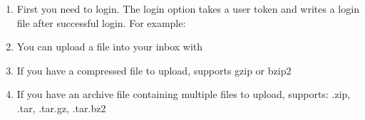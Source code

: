 \documentclass[letterpaper,10pt,english]{sphinxmanual}
\begin{document}
\begin{enumerate}
\item {} 
First you need to login. The login option takes a user token and
writes a login file after successful login. For example:

\begin{sphinxVerbatim}[commandchars=\\\{\}]
    
   
\end{sphinxVerbatim}

\item {} 
You can upload a file into your inbox with

\begin{sphinxVerbatim}[commandchars=\\\{\}]
   
\end{sphinxVerbatim}

\item {} 
If you have a compressed file to upload, supports gzip or bzip2

\begin{sphinxVerbatim}[commandchars=\\\{\}]
    
    
\end{sphinxVerbatim}

\item {} 
If you have an archive file containing multiple files to upload,
supports: .zip, .tar, .tar.gz, .tar.bz2

\begin{sphinxVerbatim}[commandchars=\\\{\}]
   
\end{sphinxVerbatim}


\end{enumerate}
\end{document}

